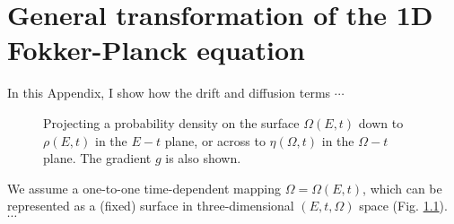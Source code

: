 
\chapter{General transformation of the 1D Fokker-Planck equation}
\label{ap:fokker}

In this Appendix, I show how the drift and diffusion terms $\cdots$



\begin{figure}[t]
\centerline{}
\caption[Probability density on the surface $\Omega(E,t)$]{
Projecting a probability density on the surface $\Omega(E,t)$
down to $\rho(E,t)$ in the $E-t$ plane,
or across to $\eta(\Omega,t)$ in the $\Omega-t$ plane.
The gradient $g$ is also shown.
}
\label{fig:fokker}
\end{figure}


We assume a one-to-one time-dependent mapping $\Omega = \Omega(E,t)$,
which can be represented as a (fixed) surface in
three-dimensional $(E,t,\Omega)$ space (Fig. \ref{fig:fokker}).
 $\cdots$



